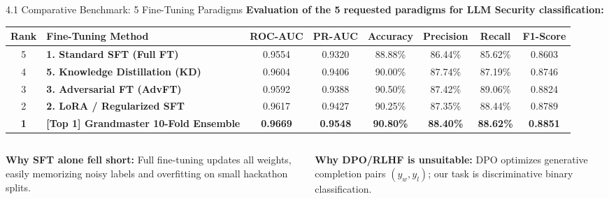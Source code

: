 \documentclass[aspectratio=169]{beamer}
\begin{document}
\begin{frame}{4.1 Comparative Benchmark: 5 Fine-Tuning Paradigms}
\textbf{Evaluation of the 5 requested paradigms for LLM Security classification:}

\vspace{0.2cm}
\begin{table}[h]
\centering
\scriptsize
\begin{tabular}{@{}clcccccc@{}}
\toprule
\textbf{Rank} & \textbf{Fine-Tuning Method} & \textbf{ROC-AUC} & \textbf{PR-AUC} & \textbf{Accuracy} & \textbf{Precision} & \textbf{Recall} & \textbf{F1-Score} \\ \midrule
5 & \textbf{1. Standard SFT (Full FT)} & 0.9554 & 0.9320 & 88.88\% & 86.44\% & 85.62\% & 0.8603 \\
4 & \textbf{5. Knowledge Distillation (KD)} & 0.9604 & 0.9406 & 90.00\% & 87.74\% & 87.19\% & 0.8746 \\
3 & \textbf{3. Adversarial FT (AdvFT)} & 0.9592 & 0.9388 & 90.50\% & 87.42\% & 89.06\% & 0.8824 \\
2 & \textbf{2. LoRA / Regularized SFT} & 0.9617 & 0.9427 & 90.25\% & 87.35\% & 88.44\% & 0.8789 \\
\rowcolor{yellow!20}
\textbf{1} & \textbf{[Top 1] Grandmaster 10-Fold Ensemble} & \textbf{0.9669} & \textbf{0.9548} & \textbf{90.80\%} & \textbf{88.40\%} & \textbf{88.62\%} & \textbf{0.8851} \\ \bottomrule
\end{tabular}
\end{table}

\vspace{0.15cm}
\begin{columns}[T]
\begin{column}{0.48\textwidth}
\textbf{Why SFT alone fell short:} Full fine-tuning updates all weights, easily memorizing noisy labels and overfitting on small hackathon splits.
\end{column}
\begin{column}{0.48\textwidth}
\textbf{Why DPO/RLHF is unsuitable:} DPO optimizes generative completion pairs $(y_w, y_l)$; our task is discriminative binary classification.
\end{column}
\end{columns}
\end{frame}
\end{document}
